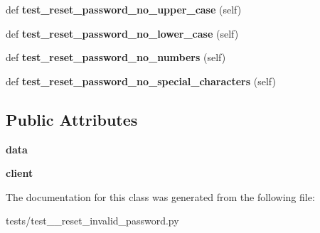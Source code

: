 \begin{DoxyCompactItemize}
def {\bfseries test\+\_\+reset\+\_\+password\+\_\+no\+\_\+upper\+\_\+case} (self)
\item 
\mbox{\label{classtests_1_1test__6__reset__invalid__password_1_1_test_user_routes_aad4a819e1a90c7c9d0a3de04f548b22c}} 
def {\bfseries test\+\_\+reset\+\_\+password\+\_\+no\+\_\+lower\+\_\+case} (self)
\item 
\mbox{\label{classtests_1_1test__6__reset__invalid__password_1_1_test_user_routes_aaf7a9ad2b80b1c994e7b0491f0bdf2fc}} 
def {\bfseries test\+\_\+reset\+\_\+password\+\_\+no\+\_\+numbers} (self)
\item 
\mbox{\label{classtests_1_1test__6__reset__invalid__password_1_1_test_user_routes_a6787c32c753eeca4ec483b193971061e}} 
def {\bfseries test\+\_\+reset\+\_\+password\+\_\+no\+\_\+special\+\_\+characters} (self)
\end{DoxyCompactItemize}
\subsection*{Public Attributes}
\begin{DoxyCompactItemize}
\item 
\mbox{\label{classtests_1_1test__6__reset__invalid__password_1_1_test_user_routes_aa0b8a34413f156b0fb7df2077c686447}} 
{\bfseries data}
\item 
\mbox{\label{classtests_1_1test__6__reset__invalid__password_1_1_test_user_routes_a20a8f75539119a70df847ca44e509e77}} 
{\bfseries client}
\end{DoxyCompactItemize}


The documentation for this class was generated from the following file\+:\begin{DoxyCompactItemize}
\item 
tests/test\+\_\+\_\+reset\+\_\+invalid\+\_\+password.\+py\end{DoxyCompactItemize}
